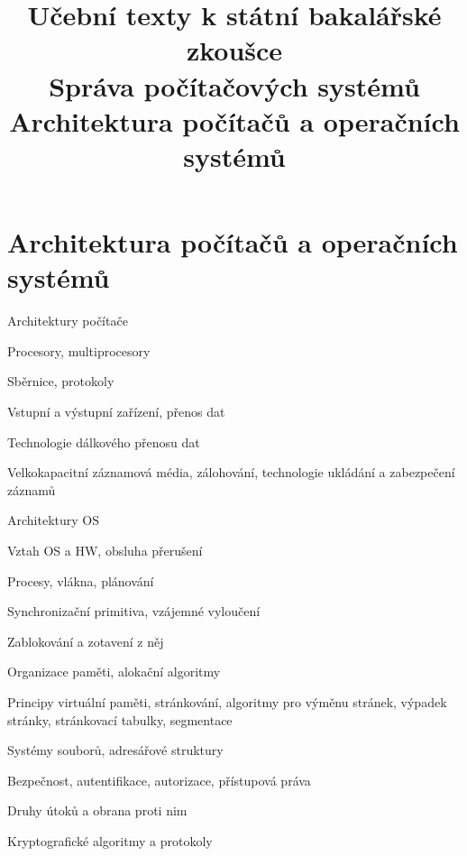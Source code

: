 \clearpage  \clearpage
\title{\LARGE Učební texty k státní bakalářské zkoušce \\ Správa počítačových systémů \\ Architektura počítačů a operačních systémů}

\maketitle
\newpage
\setcounter{section}{3}
\section{Architektura počítačů a operačních systémů}
\begin{pozadavky}
\begin{pitemize}
\item Architektury počítače
\item Procesory, multiprocesory
\item Sběrnice, protokoly
\item Vstupní a výstupní zařízení, přenos dat
\item Technologie dálkového přenosu dat
\item Velkokapacitní záznamová média, zálohování, technologie ukládání a zabezpečení záznamů
\item Architektury OS
\item Vztah OS a HW, obsluha přerušení
\item Procesy, vlákna, plánování
\item Synchronizační primitiva, vzájemné vyloučení
\item Zablokování a zotavení z něj
\item Organizace paměti, alokační algoritmy
\item Principy virtuální paměti, stránkování, algoritmy pro výměnu stránek, výpadek stránky, stránkovací tabulky, segmentace
\item Systémy souborů, adresářové struktury
\item Bezpečnost, autentifikace, autorizace, přístupová práva
\item Druhy útoků a obrana proti nim
\item Kryptografické algoritmy a protokoly
\end{pitemize}
\end{pozadavky}



